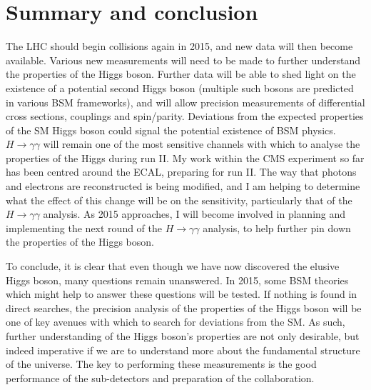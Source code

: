 \documentclass[10pt]{article}
\begin{document}
\section{Summary and conclusion}
The LHC should begin collisions again in 2015, and new data will then become available. Various new measurements will need to be made to further understand the properties of the Higgs boson. Further data will be able to shed light on the existence of a potential second Higgs boson (multiple such bosons are predicted in various BSM frameworks), and will allow precision measurements of differential cross sections, couplings and spin/parity. Deviations from the expected properties of the SM Higgs boson could signal the potential existence of BSM physics.  $H\rightarrow \gamma \gamma$ will remain one of the most sensitive channels with which to analyse the properties of the Higgs during run II. My work within the CMS experiment so far has been centred around the ECAL, preparing for run II. The way that photons and electrons are reconstructed is being modified, and I am helping to determine what the effect of this change will be on the sensitivity, particularly that of the $H \rightarrow \gamma \gamma$ analysis. As 2015 approaches, I will become involved in planning and implementing the next round of the  $H \rightarrow \gamma \gamma$ analysis, to help further pin down the properties of the Higgs boson.

To conclude, it is clear that even though we have now discovered the elusive Higgs boson, many questions remain unanswered. In 2015, some BSM theories which might help to answer these questions will be tested. If nothing is found in direct searches, the precision analysis of the properties of the Higgs boson will be one of key avenues with which to search for deviations from the SM. As such, further understanding of the Higgs boson's properties are not only desirable, but indeed imperative if we are to understand more about the fundamental structure of the universe. The key to performing these measurements is the good performance of the sub-detectors and preparation of the collaboration.




\end{document}
